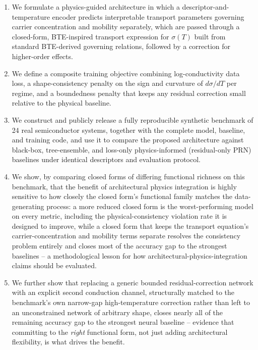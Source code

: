 \documentclass[11pt]{article}
\begin{document}
\begin{enumerate}
\item We formulate a physics-guided architecture in which a descriptor-and-temperature encoder predicts interpretable transport parameters governing carrier concentration and mobility separately, which are passed through a closed-form, BTE-inspired transport expression for $\sigma(T)$ built from standard BTE-derived governing relations, followed by a correction for higher-order effects.
\item We define a composite training objective combining log-conductivity data loss, a shape-consistency penalty on the sign and curvature of $d\sigma/dT$ per regime, and a boundedness penalty that keeps any residual correction small relative to the physical baseline.
\item We construct and publicly release a fully reproducible synthetic benchmark of 24 real semiconductor systems, together with the complete model, baseline, and training code, and use it to compare the proposed architecture against black-box, tree-ensemble, and loss-only physics-informed (residual-only PRN) baselines under identical descriptors and evaluation protocol.
\item We show, by comparing closed forms of differing functional richness on this benchmark, that the benefit of architectural physics integration is highly sensitive to how closely the closed form's functional family matches the data-generating process: a more reduced closed form is the worst-performing model on every metric, including the physical-consistency violation rate it is designed to improve, while a closed form that keeps the transport equation's carrier-concentration and mobility terms separate resolves the consistency problem entirely and closes most of the accuracy gap to the strongest baselines -- a methodological lesson for how architectural-physics-integration claims should be evaluated.
\item We further show that replacing a generic bounded residual-correction network with an explicit second conduction channel, structurally matched to the benchmark's own narrow-gap high-temperature correction rather than left to an unconstrained network of arbitrary shape, closes nearly all of the remaining accuracy gap to the strongest neural baseline -- evidence that committing to the \emph{right} functional form, not just adding architectural flexibility, is what drives the benefit.

\end{enumerate}
\end{document}
